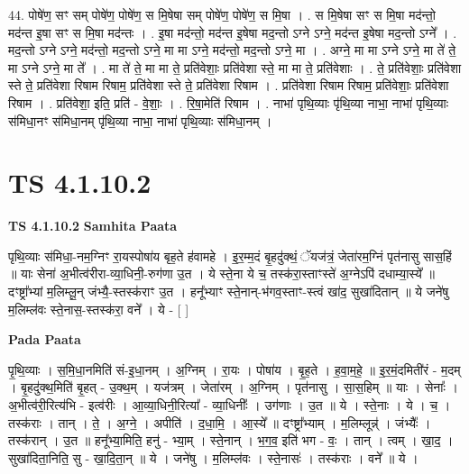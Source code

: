 \documentclass[17pt]{extarticle}
\begin{document}
44. पोषे॑ण॒ सꣳ सम् पोषे॑ण॒ पोषे॑ण॒ स मि॒षेषा सम् पोषे॑ण॒ पोषे॑ण॒ स मि॒षा । . स मि॒षेषा सꣳ स मि॒षा मद॑न्तो॒ मद॑न्त इ॒षा सꣳ स मि॒षा मद॑न्तः । . इ॒षा मद॑न्तो॒ मद॑न्त इ॒षेषा मद॒न्तो ऽग्ने ऽग्ने॒ मद॑न्त इ॒षेषा मद॒न्तो ऽग्ने᳚ । . मद॒न्तो ऽग्ने ऽग्ने॒ मद॑न्तो॒ मद॒न्तो ऽग्ने॒ मा मा ऽग्ने॒ मद॑न्तो॒ मद॒न्तो ऽग्ने॒ मा । . अग्ने॒ मा मा ऽग्ने ऽग्ने॒ मा ते॑ ते॒ मा ऽग्ने ऽग्ने॒ मा ते᳚ । . मा ते॑ ते॒ मा मा ते॒ प्रति॑वेशाः॒ प्रति॑वेशा स्ते॒ मा मा ते॒ प्रति॑वेशाः । . ते॒ प्रति॑वेशाः॒ प्रति॑वेशा स्ते ते॒ प्रति॑वेशा रिषाम रिषाम॒ प्रति॑वेशा स्ते ते॒ प्रति॑वेशा रिषाम । . प्रति॑वेशा रिषाम रिषाम॒ प्रति॑वेशाः॒ प्रति॑वेशा रिषाम । . प्रति॑वेशा॒ इति॒ प्रति॑ - वे॒शाः॒ । . रि॒षा॒मेति॑ रिषाम । . नाभा॑ पृथि॒व्याः पृ॑थि॒व्या नाभा॒ नाभा॑ पृथि॒व्याः स॑मिधा॒नꣳ स॑मिधा॒नम् पृ॑थि॒व्या नाभा॒ नाभा॑ पृथि॒व्याः स॑मिधा॒नम् । \newline
\pagebreak
{}

\section{ TS 4.1.10.2 }

\textbf{TS 4.1.10.2 } \newline
\textbf{Samhita Paata} \newline

पृथि॒व्याः स॑मिधा॒-नम॒ग्निꣳ रा॒यस्पोषा॑य बृह॒ते ह॑वामहे । इ॒र॒म्म॒दं बृ॒हदु॑क्थं॒ ॅयज॑त्रं॒ जेता॑रम॒ग्निं पृत॑नासु सास॒हिं ॥ याः सेना॑ अ॒भीत्व॑रीरा-व्या॒धिनी॒-रुग॑णा उ॒त । ये स्ते॒ना ये च॒ तस्क॑रा॒स्ताꣳस्ते॑ अ॒ग्नेऽपि॑ दधाम्या॒स्ये᳚ ॥ दꣳष्ट्रा᳚भ्यां म॒लिम्लू॒न् जंभ्यै॒-स्तस्क॑राꣳ उ॒त । हनू᳚भ्याꣳ स्ते॒नान्-भ॑गव॒स्ताꣳ-स्त्वं खा॑द॒ सुखा॑दितान् ॥ ये जने॑षु म॒लिम्ल॑वः स्ते॒नास॒-स्तस्क॑रा॒ वने᳚ । ये - [  ] \newline

\textbf{Pada Paata} \newline

पृ॒थि॒व्याः । स॒मि॒धा॒नमिति॑ सं-इ॒धा॒नम् । अ॒ग्निम् । रा॒यः । पोषा॑य । बृ॒ह॒ते । ह॒वा॒म॒हे॒ ॥ इ॒र॒मं॒दमिती॑रं - म॒दम् । बृ॒हदु॑क्थ॒मिति॑ बृ॒हत् - उ॒क्थ॒म् । यज॑त्रम् । जेता॑रम् । अ॒ग्निम् । पृत॑नासु । सा॒स॒हिम् ॥ याः । सेनाः᳚ । अ॒भीत्व॑री॒रित्य॑भि - इत्व॑रीः । आ॒व्या॒धिनी॒रित्या᳚ - व्या॒धिनीः᳚ । उग॑णाः । उ॒त ॥ ये । स्ते॒नाः । ये । च॒ । तस्क॑राः । तान् । ते॒ । अ॒ग्ने॒ । अपीति॑ । द॒धा॒मि॒ । आ॒स्ये᳚ ॥ दꣳष्ट्रा᳚भ्याम् । म॒लिम्लून्न्॑ । जंभ्यैः᳚ । तस्क॑रान् । उ॒त ॥ हनू᳚भ्या॒मिति॒ हनु॑ - भ्या॒म् । स्ते॒नान् । भ॒ग॒व॒ इति॑ भग - वः॒ । तान् । त्वम् । खा॒द॒ । सुखा॑दिता॒निति॒ सु - खा॒दि॒ता॒न् ॥ ये । जने॑षु । म॒लिम्ल॑वः । स्ते॒नासः॑ । तस्क॑राः । वने᳚ ॥ ये ।  \newline
\end{document}
